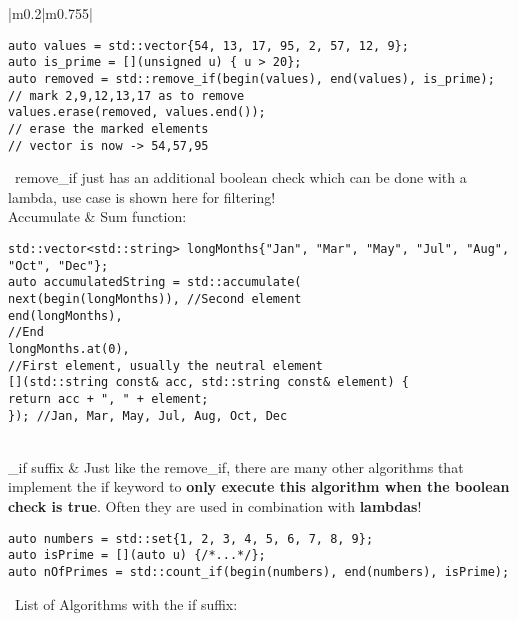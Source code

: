 \documentclass[main.tex,fontsize=8pt,paper=a4,paper=portrait,DIV=calc,]{scrartcl}
\begin{document}
\begin{table}[ht!]
\begin{tabular}{|m{0.2\linewidth}|m{0.755\linewidth}|}
\begin{lstlisting}
auto values = std::vector{54, 13, 17, 95, 2, 57, 12, 9};
auto is_prime = [](unsigned u) { u > 20};
auto removed = std::remove_if(begin(values), end(values), is_prime);
// mark 2,9,12,13,17 as to remove
values.erase(removed, values.end());
// erase the marked elements
// vector is now -> 54,57,95
\end{lstlisting} 
\, \newline
remove\_if just has an additional boolean check which can be done with a lambda, use case is shown here for filtering!\\
\hline
Accumulate & 
Sum function:\newline
\begin{lstlisting}
std::vector<std::string> longMonths{"Jan", "Mar", "May", "Jul", "Aug", "Oct", "Dec"};
auto accumulatedString = std::accumulate(
next(begin(longMonths)), //Second element
end(longMonths),
//End
longMonths.at(0),
//First element, usually the neutral element
[](std::string const& acc, std::string const& element) {
return acc + ", " + element;
}); //Jan, Mar, May, Jul, Aug, Oct, Dec
\end{lstlisting}\\
\hline
\_if suffix & 
Just like the remove\_if, there are many other algorithms that implement the if keyword to \textbf{only execute this algorithm when the boolean check is true}.\newline
Often they are used in combination with \textbf{lambdas}!
\begin{lstlisting}
auto numbers = std::set{1, 2, 3, 4, 5, 6, 7, 8, 9};
auto isPrime = [](auto u) {/*...*/};
auto nOfPrimes = std::count_if(begin(numbers), end(numbers), isPrime);
\end{lstlisting}
\, \newline
List of Algorithms with the if suffix:\newline
\minipg{
\begin{itemize}
\item \textcolor{teal}{count\_if}
\item \textcolor{teal}{find\_if}
\item \textcolor{teal}{find\_if\_not}
\item \textcolor{teal}{copy\_if}
\end{itemize} 
}{\begin{itemize}
\item \textcolor{teal}{count\_if}
\item \textcolor{teal}{find\_if}
\item \textcolor{teal}{find\_if\_not}

\end{itemize}}
\end{tabular}
\end{table}
\end{document}
